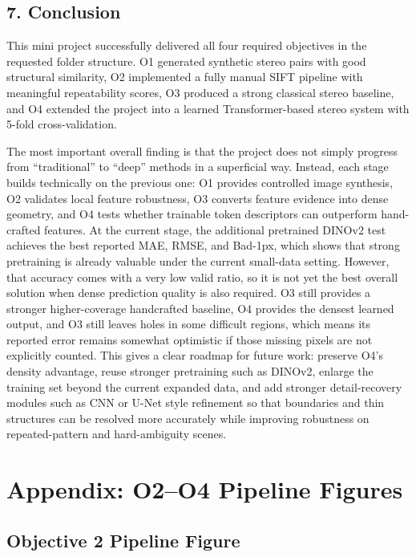 \documentclass[
  11pt,
]{article}
\begin{document}
\subsection{7. Conclusion}\label{conclusion}

This mini project successfully delivered all four required objectives in
the requested folder structure. O1 generated synthetic stereo pairs with
good structural similarity, O2 implemented a fully manual SIFT pipeline
with meaningful repeatability scores, O3 produced a strong classical
stereo baseline, and O4 extended the project into a learned
Transformer-based stereo system with 5-fold cross-validation.

The most important overall finding is that the project does not simply
progress from ``traditional'' to ``deep'' methods in a superficial way.
Instead, each stage builds technically on the previous one: O1 provides
controlled image synthesis, O2 validates local feature robustness, O3
converts feature evidence into dense geometry, and O4 tests whether
trainable token descriptors can outperform hand-crafted features. At the
current stage, the additional pretrained DINOv2 test achieves the best
reported MAE, RMSE, and Bad-1px, which shows that strong pretraining is
already valuable under the current small-data setting. However, that
accuracy comes with a very low valid ratio, so it is not yet the best
overall solution when dense prediction quality is also required. O3
still provides a stronger higher-coverage handcrafted baseline, O4
provides the densest learned output, and O3 still leaves holes in some
difficult regions, which means its reported error remains somewhat
optimistic if those missing pixels are not explicitly counted. This
gives a clear roadmap for future work: preserve O4's density advantage,
reuse stronger pretraining such as DINOv2, enlarge the training set
beyond the current expanded data, and add stronger detail-recovery
modules such as CNN or U-Net style refinement so that boundaries and
thin structures can be resolved more accurately while improving
robustness on repeated-pattern and hard-ambiguity scenes.

\clearpage
\appendix
\section{Appendix: O2--O4 Pipeline Figures}

\subsection*{Objective 2 Pipeline Figure}
\end{document}
